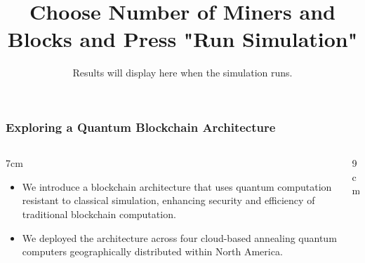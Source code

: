 \documentclass[aspectratio=169,forpublic,12pt,final]{beamer}
\title{Choose Number of Miners and Blocks and Press "Run Simulation"}
\subtitle{Results will display here when the simulation runs.}
\begin{document}
\maketitlering
{}

\begin{frame}\frametitle{Exploring a Quantum Blockchain Architecture}
	
	\begin{columns}
		\begin{column}{7cm}
			\begin{itemize}\itemsep2mm%
				\item We introduce a blockchain architecture that uses quantum computation resistant to classical simulation, enhancing security and efficiency of traditional blockchain computation.
				\item We deployed the architecture across four cloud-based annealing quantum computers geographically distributed within North America.
			\end{itemize}
		\end{column}
		\begin{column}{9cm}

		\end{column}
	\end{columns}	
\end{frame}




  
\end{document}

